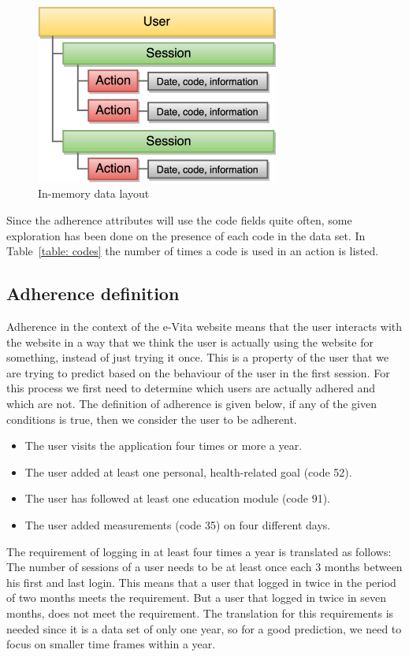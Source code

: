 \begin{figure}[!h]
	\centering
	\includegraphics[width=80mm]{dataSmall.png}
	\caption{In-memory data layout}
	\label{figure:dataLayout}
\end{figure}

Since the adherence attributes will use the code fields quite often, some exploration has been done on the presence of each code in the data set. In Table~\ref{table: codes} the number of times a code is used in an action is listed.

\subsection{Adherence definition}
Adherence in the context of the e-Vita website means that the user interacts with the website in a way that we think the user is actually using the website for something, instead of just trying it once. This is a property of the user that we are trying to predict based on the behaviour of the user in the first session. For this process we first need to determine which users are actually adhered and which are not. The definition of adherence is given below, if any of the given conditions is true, then we consider the user to be adherent.

\begin{itemize}
	\item The user visits the application four times or more a year.
	\item The user added at least one personal, health-related goal (code 52).
	\item The user has followed at least one education module (code 91).
	\item The user added measurements (code 35) on four different days.
\end{itemize}

The requirement of logging in at least four times a year is translated as follows: The number of sessions of a user needs to be at least once each 3 months between his first and last login. This means that a user that logged in twice in the period of two months meets the requirement. But a user that logged in twice in seven months, does not meet the requirement. The translation for this requirements is needed since it is a data set of only one year, so for a good prediction, we need to focus on smaller time frames within a year.

